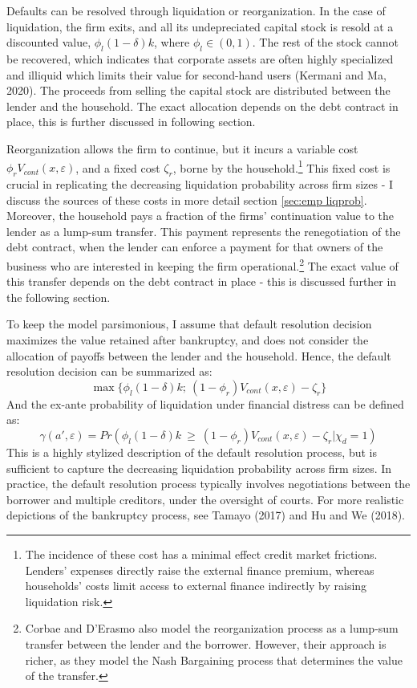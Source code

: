 \documentclass[12pt]{article}
\begin{document}
Defaults can be resolved through liquidation or reorganization. In the case of liquidation, the firm exits, and all its undepreciated capital stock is resold at a discounted value, $\phi_l(1-\delta)k$, where $\phi_l \in (0,1)$. The rest of the stock cannot be recovered, which indicates that corporate assets are often highly specialized and illiquid which limits their value for second-hand users (Kermani and Ma, 2020). The proceeds from selling the capital stock are distributed between the lender and the household. The exact allocation depends on the debt contract in place, this is further discussed in following section. 

Reorganization allows the firm to continue, but it incurs a variable cost $\phi_r V_{cont}(x,\varepsilon)$, and a fixed cost $\zeta_r$, borne by the household.\footnote{The incidence of these cost has a minimal effect credit market frictions. Lenders' expenses directly raise the external finance premium, whereas households' costs limit access to external finance indirectly by raising liquidation risk.} This fixed cost is crucial in replicating the decreasing liquidation probability across firm sizes - I discuss the sources of these costs in more detail section \ref{sec:emp liqprob}. Moreover, the household pays a fraction of the firms' continuation value to the lender as a lump-sum transfer. This payment represents the renegotiation of the debt contract, when the lender can enforce a payment for that owners of the business who are interested in keeping the firm operational.\footnote{Corbae and D'Erasmo also model the reorganization process as a lump-sum transfer between the lender and the borrower. However, their approach is richer, as they model the Nash Bargaining process that determines the value of the transfer.} The exact value of this transfer depends on the debt contract in place - this is discussed further in the following section. 

To keep the model parsimonious, I assume that default resolution decision maximizes the value retained after bankruptcy, and does not consider the allocation of payoffs between the lender and the household. Hence, the default resolution decision can be summarized as: 
\begin{equation} \label{eq:liquidation decision}
 \max \{ \phi_l (1-\delta) k; \ (1-\phi_r) V_{cont}(x,\varepsilon)- \zeta_r\}
\end{equation}
And the ex-ante probability of liquidation under financial distress can be defined as: 
\begin{equation} \label{eq:liquidation probability}
    \gamma(a', \varepsilon) = Pr(\phi_l (1-\delta) k \ \geq \ (1-\phi_r) V_{cont}(x,\varepsilon) - \zeta_r | \chi_d = 1)
\end{equation} 
This is a highly stylized description of the default resolution process, but is sufficient to capture the decreasing liquidation probability across firm sizes. In practice, the default resolution process typically involves negotiations between the borrower and multiple creditors, under the oversight of courts. For more realistic depictions of the bankruptcy process, see Tamayo (2017) and Hu and We (2018). 
\end{document}
